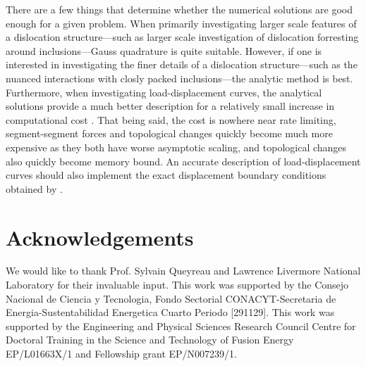 \documentclass[11pt]{iopart}
\begin{document}
There are a few things that determine whether the numerical solutions are good enough for a given problem. When primarily investigating larger scale features of a dislocation structure---such as larger scale investigation of dislocation forresting around inclusions---Gauss quadrature is quite suitable. However, if one is interested in investigating the finer details of a dislocation structure---such as the nuanced interactions with closly packed inclusions---the analytic method is best. Furthermore, when investigating load-displacement curves, the analytical solutions provide a much better description for a relatively small increase in computational cost \cite{Queyreau}. That being said, the cost is nowhere near rate limiting, segment-segment forces and topological changes quickly become much more expensive as they both have worse asymptotic scaling, and topological changes also quickly become memory bound. An accurate description of load-displacement curves should also implement the exact displacement boundary conditions obtained by \citet{ddd_disp}.

\section{Acknowledgements}

We would like to thank Prof. Sylvain Queyreau and Lawrence Livermore National Laboratory for their invaluable input. This work was supported by the Consejo Nacional de Ciencia y Tecnologia, Fondo Sectorial CONACYT-Secretaria de Energia-Sustentabilidad Energetica Cuarto Periodo [291129]. This work was supported by the Engineering and Physical Sciences Research Council Centre for Doctoral Training in the Science and Technology of Fusion Energy EP/L01663X/1 and Fellowship grant EP/N007239/1.

\newcommand{\newblock}{}








\end{document}
